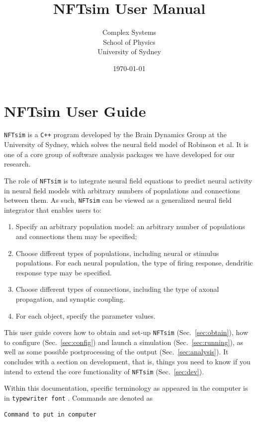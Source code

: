 \documentclass[12pt,a4paper]{article}
\title{NFTsim User Manual}
\author{Complex Systems\\School of Physics\\University of Sydney}
\date{\today}
\newcommand{\type}[1]{{\small\small\tt #1} }
\newcommand{\NF}[0]{\type{NFTsim}}
\newenvironment{worked_example}
{\begin{lrbox}{\mybox}\begin{minipage}{\textwidth}}
{\end{minipage}\end{lrbox}\fcolorbox{black}{skyblue}{\parbox{\textwidth}{{\bf Worked example}\\\\\usebox{\mybox}}}}
\begin{document}
\section*{NFTsim User Guide}

\NF is a \type{C++} program developed by the Brain Dynamics Group at the University of Sydney, which solves the neural field model of Robinson et al. It is one of a core group of software analysis packages we have developed for our research.

The role of \NF is to integrate neural field equations to predict neural activity in neural field models with arbitrary numbers of populations and connections between them. As such, \NF can be viewed as a generalized neural field integrator that enables users to:

\begin{enumerate}
    \item Specify an arbitrary population model: an arbitrary number of populations and connections them may be specified;
    \item Choose different types of populations, including neural or stimulus populations. For each neural population, the type of firing response, dendritic response type may be specified.
    \item Choose different types of connections, including the type of axonal propagation, and synaptic coupling.
    \item For each object, specify the parameter values.
\end{enumerate}

This user guide covers how to obtain and set-up \NF (Sec.~\ref{sec:obtain}), how to configure (Sec.~\ref{sec:config}) and launch a simulation (Sec.~\ref{sec:running}), as well as some possible postprocessing of the output (Sec.~\ref{sec:analysis}).
It concludes with a section on development, that is, things you need to know if you intend to extend the core functionality of \NF (Sec.~\ref{sec:dev}).

Within this documentation, specific terminology as appeared in the computer is in \type{typewriter font}. Commands are denoted as
\begin{lstlisting}
Command to put in computer
\end{lstlisting}

\end{document}
